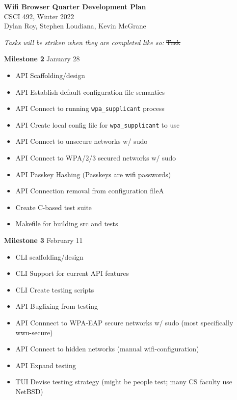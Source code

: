 \documentclass[11pt]{article}
\begin{document}
\begin{center}
  \textbf{\Large Wifi Browser Quarter Development Plan}\\\large CSCI 492, Winter 2022\\
  Dylan Roy, Stephen Loudiana, Kevin McGrane
\end{center}


\textit{Tasks will be striken when they are completed like so:} \sout{Task}

\textbf{Milestone 2} January 28
\begin{itemize}
  \item API Scaffolding/design
  \item API Establish default configuration file semantics
  \item API Connect to running \texttt{wpa\_supplicant} process
  \item API Create local config file for \texttt{wpa\_supplicant} to use
  \item API Connect to unsecure networks w/ sudo
  \item API Connect to WPA/2/3 secured networks w/ sudo
  \item API Passkey Hashing (Passkeys are wifi passwords)
  \item API Connection removal from configuration fileA
  \item Create C-based test suite
  \item Makefile for building src and tests
\end{itemize}

\textbf{Milestone 3} February 11
\begin{itemize}
  \item CLI scaffolding/design
  \item CLI Support for current API features
  \item CLI Create testing scripts
  \item API Bugfixing from testing
  \item API Connnect to WPA-EAP secure networks w/ sudo (most specifically wwu-secure)
  \item API Connect to hidden networks (manual wifi-configuration)
  \item API Expand testing
  \item TUI Devise testing strategy (might be people test; many CS faculty use NetBSD)
\end{itemize}
\end{document}
